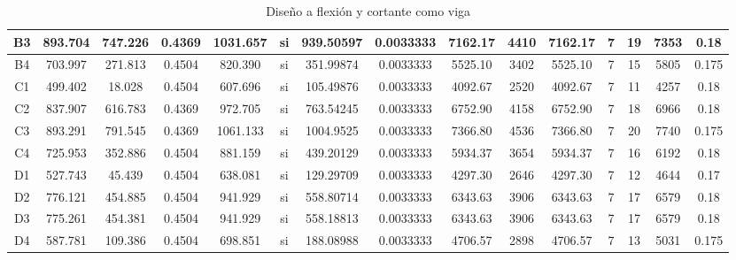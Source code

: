 \begin{table}[H]
{\begin{tabular}{|c|c|c|c|c|c|c|c|c|c|c|c|c|c|c|}
\hline
B3  & 893.704 & 747.226 & 0.4369 & 1031.657 & si  & 939.50597 & 0.0033333 & 7162.17 & 4410 & 7162.17 & 7   & 19  & 7353 & 0.18 \bigstrut\\
\hline
B4  & 703.997 & 271.813 & 0.4504 & 820.390 & si  & 351.99874 & 0.0033333 & 5525.10 & 3402 & 5525.10 & 7   & 15  & 5805 & 0.175 \bigstrut\\
\hline
C1  & 499.402 & 18.028 & 0.4504 & 607.696 & si  & 105.49876 & 0.0033333 & 4092.67 & 2520 & 4092.67 & 7   & 11  & 4257 & 0.18 \bigstrut\\
\hline
C2  & 837.907 & 616.783 & 0.4369 & 972.705 & si  & 763.54245 & 0.0033333 & 6752.90 & 4158 & 6752.90 & 7   & 18  & 6966 & 0.18 \bigstrut\\
\hline
C3  & 893.291 & 791.545 & 0.4369 & 1061.133 & si  & 1004.9525 & 0.0033333 & 7366.80 & 4536 & 7366.80 & 7   & 20  & 7740 & 0.175 \bigstrut\\
\hline
C4  & 725.953 & 352.886 & 0.4504 & 881.159 & si  & 439.20129 & 0.0033333 & 5934.37 & 3654 & 5934.37 & 7   & 16  & 6192 & 0.18 \bigstrut\\
\hline
D1  & 527.743 & 45.439 & 0.4504 & 638.081 & si  & 129.29709 & 0.0033333 & 4297.30 & 2646 & 4297.30 & 7   & 12  & 4644 & 0.17 \bigstrut\\
\hline
D2  & 776.121 & 454.885 & 0.4504 & 941.929 & si  & 558.80714 & 0.0033333 & 6343.63 & 3906 & 6343.63 & 7   & 17  & 6579 & 0.18 \bigstrut\\
\hline
D3  & 775.261 & 454.381 & 0.4504 & 941.929 & si  & 558.18813 & 0.0033333 & 6343.63 & 3906 & 6343.63 & 7   & 17  & 6579 & 0.18 \bigstrut\\
\hline
D4  & 587.781 & 109.386 & 0.4504 & 698.851 & si  & 188.08988 & 0.0033333 & 4706.57 & 2898 & 4706.57 & 7   & 13  & 5031 & 0.175 \bigstrut\\
\hline
\end{tabular}}%

    \caption{Diseño a flexión y cortante como viga}
    \label{tab:cyf_zapata}
\end{table}